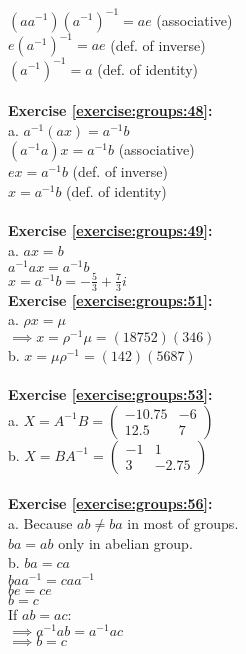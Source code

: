 $(aa^{-1})(a^{-1})^{-1}=ae$ (associative)\\
$e(a^{-1})^{-1}=ae$ (def. of inverse)\\
$(a^{-1})^{-1}=a$ (def. of identity)\\
\\
\textbf{Exercise \ref{exercise:groups:48}:}\\
a. $a^{-1}(ax)=a^{-1}b$\\
$(a^{-1}a)x=a^{-1}b$ (associative)\\
$ex=a^{-1}b$ (def. of inverse)\\
$x=a^{-1}b$ (def. of identity)\\
\\
\textbf{Exercise \ref{exercise:groups:49}:}\\
a. $ax=b$\\
$a^{-1}ax=a^{-1}b$\\
$x=a^{-1}b=-\displaystyle\frac{5}{3}+\displaystyle\frac{7}{3}i$
\\
\textbf{Exercise \ref{exercise:groups:51}:}\\
a. $\rho x=\mu$\\
$\implies x=\rho^{-1}\mu=(18752)(346)$\\
b. $x=\mu\rho^{-1}=(142)(5687)$\\
\\
\textbf{Exercise \ref{exercise:groups:53}:}\\
a. $X=A^{-1}B=\begin{pmatrix}
-10.75 & -6\\
12.5 & 7
\end{pmatrix}$\\
b. $X=BA^{-1}=\begin{pmatrix}
-1 & 1\\
3 & -2.75
\end{pmatrix}$\\
\\
\textbf{Exercise \ref{exercise:groups:56}:}\\
a. Because $ab\neq ba$ in most of groups.\\
$ba=ab$ only in abelian group.\\
b. $ba=ca$\\
$baa^{-1}=caa^{-1}$\\
$be=ce$\\
$b=c$\\
If $ab=ac$:\\
$\implies a^{-1}ab=a^{-1}ac$\\
$\implies b=c$\\
\\
